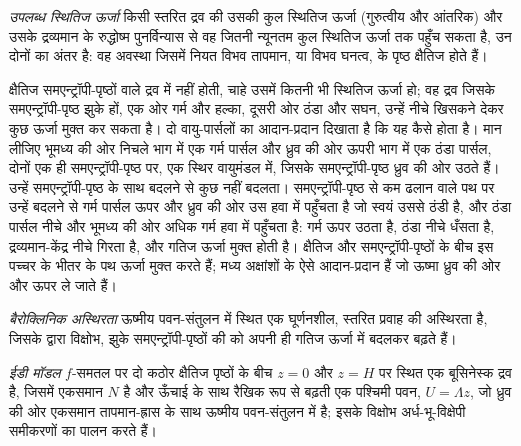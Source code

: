 \begin{definition}[उपलब्ध स्थितिज ऊर्जा]\label{def:b3:atmospheric-dynamics:ape}
\emph{उपलब्ध स्थितिज ऊर्जा} किसी स्तरित द्रव की
उसकी कुल स्थितिज ऊर्जा (गुरुत्वीय और आंतरिक) और
उसके द्रव्यमान के रुद्धोष्म पुनर्विन्यास से वह जितनी न्यूनतम कुल स्थितिज ऊर्जा
तक पहुँच सकता है, उन दोनों का अंतर है: वह अवस्था जिसमें
नियत विभव तापमान, या विभव घनत्व, के पृष्ठ
क्षैतिज होते हैं।
\end{definition}

क्षैतिज समएन्ट्रॉपी-पृष्ठों वाले द्रव में  नहीं होती, चाहे
उसमें कितनी भी स्थितिज ऊर्जा हो; वह द्रव जिसके समएन्ट्रॉपी-पृष्ठ झुके हों, एक ओर गर्म और हल्का, दूसरी ओर ठंडा
और सघन, उन्हें नीचे खिसकने देकर कुछ ऊर्जा मुक्त कर सकता है। दो वायु-पार्सलों का
आदान-प्रदान दिखाता है कि यह कैसे होता है। मान लीजिए भूमध्य की ओर निचले भाग में एक गर्म पार्सल और
ध्रुव की ओर ऊपरी भाग में एक ठंडा पार्सल, दोनों एक ही समएन्ट्रॉपी-पृष्ठ पर, एक स्थिर
वायुमंडल में, जिसके समएन्ट्रॉपी-पृष्ठ ध्रुव की ओर उठते हैं। उन्हें समएन्ट्रॉपी-पृष्ठ के साथ
बदलने से कुछ नहीं बदलता। समएन्ट्रॉपी-पृष्ठ से कम ढलान वाले पथ पर उन्हें बदलने से
गर्म पार्सल ऊपर और ध्रुव की ओर उस हवा में पहुँचता है जो स्वयं उससे ठंडी है,
और ठंडा पार्सल नीचे और भूमध्य की ओर अधिक गर्म हवा में पहुँचता है: गर्म ऊपर
उठता है, ठंडा नीचे धँसता है, द्रव्यमान-केंद्र नीचे गिरता है, और गतिज
ऊर्जा मुक्त होती है। क्षैतिज और समएन्ट्रॉपी-पृष्ठों के बीच इस पच्चर के भीतर के पथ
ऊर्जा मुक्त करते हैं; मध्य अक्षांशों के  ऐसे आदान-प्रदान हैं जो ऊष्मा
ध्रुव की ओर और ऊपर ले जाते हैं।

\begin{definition}[बैरोक्लिनिक अस्थिरता]\label{def:b3:atmospheric-dynamics:baroclinic-instability}
\emph{बैरोक्लिनिक अस्थिरता} ऊष्मीय पवन-संतुलन में
स्थित एक घूर्णनशील, स्तरित प्रवाह की अस्थिरता है, जिसके द्वारा
विक्षोभ, झुके समएन्ट्रॉपी-पृष्ठों की  को
अपनी ही गतिज ऊर्जा में बदलकर बढ़ते हैं।
\end{definition}

\begin{definition}[ईडी मॉडल]\label{def:b3:atmospheric-dynamics:eady}
\emph{ईडी मॉडल} $f$-समतल पर दो कठोर क्षैतिज पृष्ठों के बीच
$z = 0$ और $z = H$ पर स्थित एक बूसिनेस्क द्रव है, जिसमें एकसमान
 $N$ है और ऊँचाई के साथ रैखिक रूप से बढ़ती एक पश्चिमी पवन,
$U = \Lambda z$, जो ध्रुव की ओर एकसमान तापमान-ह्रास के साथ ऊष्मीय पवन-संतुलन में है;
इसके विक्षोभ अर्ध-भू-विक्षेपी
समीकरणों का पालन करते हैं।
\end{definition}

